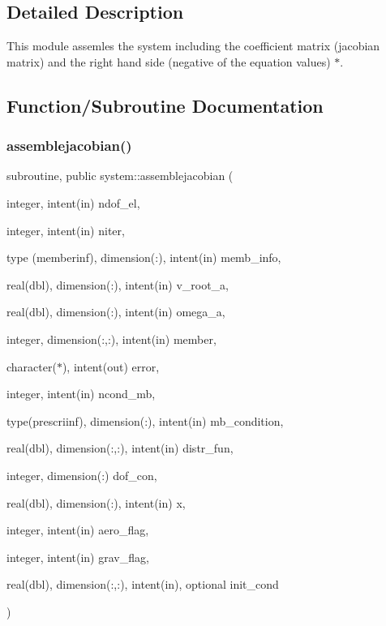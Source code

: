 \subsection{Detailed Description}
This module assemles the system including the coefficient matrix (jacobian matrix) and the right hand side (negative of the equation values) $\ast$. 

\subsection{Function/\+Subroutine Documentation}
\mbox{\label{namespacesystem_aca86d62bded01533c138c9e2298cc804}} 
\subsubsection{\texorpdfstring{assemblejacobian()}{assemblejacobian()}}
{\footnotesize\ttfamily subroutine, public system\+::assemblejacobian (\begin{DoxyParamCaption}\item[{integer, intent(in)}]{ndof\+\_\+el,  }\item[{integer, intent(in)}]{niter,  }\item[{type (memberinf), dimension(\+:), intent(in)}]{memb\+\_\+info,  }\item[{real(dbl), dimension(\+:), intent(in)}]{v\+\_\+root\+\_\+a,  }\item[{real(dbl), dimension(\+:), intent(in)}]{omega\+\_\+a,  }\item[{integer, dimension(\+:,\+:), intent(in)}]{member,  }\item[{character($\ast$), intent(out)}]{error,  }\item[{integer, intent(in)}]{ncond\+\_\+mb,  }\item[{type(prescriinf), dimension(\+:), intent(in)}]{mb\+\_\+condition,  }\item[{real(dbl), dimension(\+:,\+:), intent(in)}]{distr\+\_\+fun,  }\item[{integer, dimension(\+:)}]{dof\+\_\+con,  }\item[{real(dbl), dimension(\+:), intent(in)}]{x,  }\item[{integer, intent(in)}]{aero\+\_\+flag,  }\item[{integer, intent(in)}]{grav\+\_\+flag,  }\item[{real(dbl), dimension(\+:,\+:), intent(in), optional}]{init\+\_\+cond }\end{DoxyParamCaption})}



